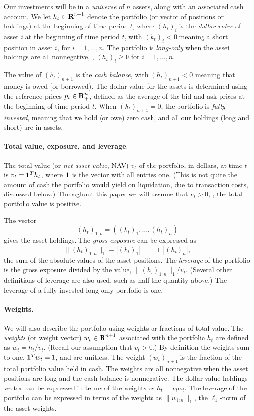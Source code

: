 \documentclass[openany]{now}
\begin{document}
Our investments will be in a \emph{universe} of $n$ assets,
along with an associated cash account.
We let $h_t \in {\mbox{\bf R}}^{n+1}$ denote the portfolio
(or vector of positions or holdings) at the beginning of time period $t$,
where $(h_t)_i$ is the \emph{dollar
value} of asset $i$ at the beginning of time period $t$, with $(h_t)_i <0$
meaning a short position in asset $i$, for $i=1, \ldots, n$.
The portfolio is \emph{long-only} when the asset holdings are all
nonnegative, \ie, $(h_t)_i \geq 0$ for $i=1, \ldots, n$.

The value of $(h_t)_{n+1}$ is the \emph{cash balance},
with $(h_t)_{n+1}<0$ meaning that money is owed (or borrowed).
The dollar value for the assets
is determined using the reference prices $p_t \in {\mbox{\bf R}}^n_+$,
defined as the average of the bid and ask prices at the beginning of
time period $t$.
When $(h_t)_{n+1}=0$, the portfolio is \emph{fully invested}, meaning that
we hold (or owe) zero cash, and all our holdings (long and short) are in
assets.

\paragraph{Total value, exposure, and leverage.}
The total value (or \emph{net asset value}, NAV)
$v_t$ of the portfolio, in dollars,
at time $t$ is $v_t = \mathbf 1^Th_t$, where
$\mathbf 1$ is the vector with all entries one.
(This is not quite the amount of cash the portfolio would yield on liquidation,
due to transaction costs, discussed below.)
Throughout this paper we will assume that $v_t>0$, \ie, the total
portfolio value is positive.

The vector
\[
(h_t)_{1:n} = ((h_t)_1, \ldots, (h_t)_n)
\]
gives the asset holdings.
The \emph{gross exposure} can be expressed as
\[
\|(h_t)_{1:n}\|_1 = |(h_t)_1| + \cdots + |(h_t)_n|,
\]
the sum of the absolute values of the asset positions.
The \emph{leverage} of the portfolio is the gross exposure divided by
the value, $\|(h_t)_{1:n}\|_1/v_t$.
(Several other definitions of leverage are also used, such as
half the quantity above.)
The leverage of a fully invested long-only portfolio is one.

\paragraph{Weights.}
We will also describe the portfolio using weights or fractions
of total value.
The \emph{weights} (or weight vector) $w_t \in {\mbox{\bf R}}^{n+1}$
associated with the portfolio $h_t$ are defined as
$w_t = h_t/v_t$. (Recall our assumption that $v_t>0$.)
By definition the weights sum to one, $\mathbf 1^Tw_t=1$, and are unitless.
The weight $(w_t)_{n+1}$ is the fraction of the total portfolio
value held in cash.
The weights are all nonnegative when the asset positions
are long and the cash balance is nonnegative.
The dollar value holdings vector can be expressed in terms of the weights
as $h_t = v_t w_t$.
The leverage of the portfolio can be expressed in terms of the
weights as $\|w_{1:n}\|_1$, the $\ell_1$-norm of the asset weights.
\end{document}
